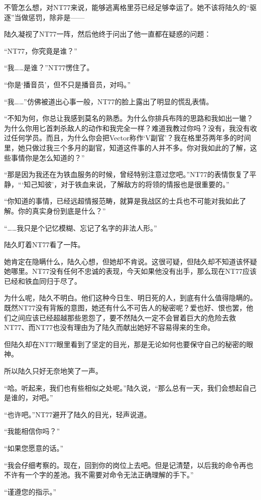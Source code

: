 不管怎么想，对NT77来说，能够逃离格里芬已经足够幸运了。她不该将陆久的“驱逐”当做惩罚，除非是——

陆久凝视了NT77一阵，然后他终于问出了他一直都在疑惑的问题：

“NT77，你究竟是谁？”

“我……是谁？”NT77愣住了。

“你是‘播音员’，但不只是播音员，对吗。”

“我……”仿佛被道出心事一般，NT77的脸上露出了明显的慌乱表情。

“不知为何，你总让我感到莫名的熟悉。为什么你排兵布阵的思路和我如出一辙？为什么你用匕首刺杀敌人的动作和我完全一样？难道我教过你吗？没有，我没有收过任何学员。而且，为什么你会把Vector称作‘V副官’？我在格里芬两年多的时间里，她只做过我三个多月的副官，知道这件事的人并不多。你对我如此的了解，这些事情你是怎么知道的？”

“那是因为我还在为铁血服务的时候，曾经特别注意过您吧。”NT77的表情恢复了平静，“‘知己知彼’，对于铁血来说，了解敌方的将领的情报也是很重要的。”

“你知道的事情，已经远超情报范畴，就算是我战区的士兵也不可能对我如此了解。你的真实身份到底是什么？”

“……我只是个记忆模糊、忘记了名字的非法人形。”

陆久盯着NT77看了一阵。

她肯定在隐瞒什么，陆久心想，但她却不肯说。这很可疑，但陆久却不知道该怀疑她哪里。NT77没有任何不忠诚的表现，今天如果他没有出手，那么现在NT77应该已经和铁血同归于尽了。

为什么呢，陆久不明白。他们这种今日生、明日死的人，到底有什么值得隐瞒的。既然NT77没有背叛的意图，她还有什么不可告人的秘密呢？爱也好、恨也罢，他们之间应该已经超越那些恩怨了，要不然陆久一定不会冒着巨大的危险去救NT77、而NT77也没有理由为了陆久而献出她好不容易得来的生命。

但陆久却在NT77眼里看到了坚定的目光，那是无论如何也要保守自己的秘密的眼神。

所以陆久只好无奈地笑了一声。

“哈。听起来，我们也有些相似之处呢。”陆久说，“那么总有一天，我们会想起自己是谁的，对吧。”

“也许吧。”NT77避开了陆久的目光，轻声说道。

“我能相信你吗？”

“如果您愿意的话。”

“我会仔细考察的。现在，回到你的岗位上去吧。但是记清楚，以后我的命令再也不许有一个字的差池。我不需要对命令无法正确理解的手下。”

“谨遵您的指示。”

